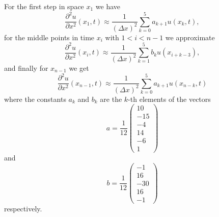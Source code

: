 \documentclass[00main.tex]{subfiles}
\begin{document}
For the first step in space $x_1$ we have \[ \frac{\partial^2u}{\partial x^2} (x_1,t) \approx \frac{1}{(\Delta x)^2} \sum_{k=0}^5 a_{k+1} u(x_k,t), \]
for the middle points in time $x_i$ with $1 < i < n-1$ we approximate \[ \frac{\partial^2u}{\partial x^2} (x_i,t) \approx \frac{1}{(\Delta x)^2} \sum_{k=1}^5 b_k u(x_{i+k-3}), \] 
and finally for $x_{n-1}$ we get \[ \frac{\partial^2u}{\partial x^2} (x_{n-1},t) \approx \frac{1}{(\Delta x)^2} \sum_{k=0}^5 a_{k+1} u(x_{n-k},t) \] where the constants $a_k$ and $b_k$ are the $k$-th elements of the vectors \[ a = \frac{1}{12} \left( \begin{array}{c}
10\\ -15\\ -4\\ 14\\ -6 \\ 1
\end{array} \right) \] and \[ b = \frac{1}{12} \left( \begin{array}{c} -1\\ 16\\ -30\\ 16\\ -1 \end{array} \right) \] respectively.
\end{document}
